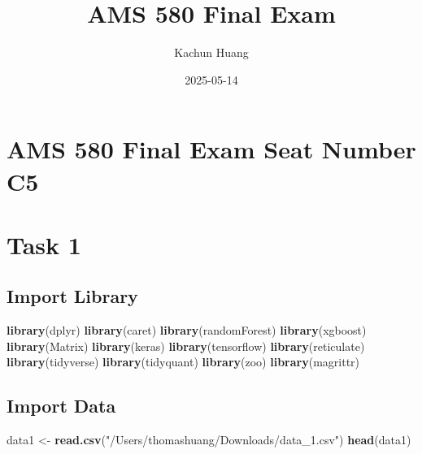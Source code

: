 \documentclass[
]{article}
\title{AMS 580 Final Exam}
\author{Kachun Huang}
\date{2025-05-14}
\newenvironment{Shaded}{\begin{snugshade}}{\end{snugshade}}
\newcommand{\FunctionTok}[1]{\textcolor[rgb]{0.13,0.29,0.53}{\textbf{#1}}}
\newcommand{\NormalTok}[1]{#1}
\newcommand{\OtherTok}[1]{\textcolor[rgb]{0.56,0.35,0.01}{#1}}
\newcommand{\StringTok}[1]{\textcolor[rgb]{0.31,0.60,0.02}{#1}}
\begin{document}
\maketitle

\section{\texorpdfstring{AMS 580 Final Exam \textbf{Seat Number
C5}}{AMS 580 Final Exam Seat Number C5}}\label{ams-580-final-exam-seat-number-c5}

\section{Task 1}\label{task-1}

\subsection{Import Library}\label{import-library}

\begin{Shaded}
\begin{Highlighting}[]
\FunctionTok{library}\NormalTok{(dplyr)}
\FunctionTok{library}\NormalTok{(caret)}
\FunctionTok{library}\NormalTok{(randomForest)}
\FunctionTok{library}\NormalTok{(xgboost)}
\FunctionTok{library}\NormalTok{(Matrix)}
\FunctionTok{library}\NormalTok{(keras)}
\FunctionTok{library}\NormalTok{(tensorflow)}
\FunctionTok{library}\NormalTok{(reticulate)}
\FunctionTok{library}\NormalTok{(tidyverse)}
\FunctionTok{library}\NormalTok{(tidyquant)}
\FunctionTok{library}\NormalTok{(zoo)}
\FunctionTok{library}\NormalTok{(magrittr)}
\end{Highlighting}
\end{Shaded}

\subsection{Import Data}\label{import-data}

\begin{Shaded}
\begin{Highlighting}[]
\NormalTok{data1 }\OtherTok{\textless{}{-}} \FunctionTok{read.csv}\NormalTok{(}\StringTok{"/Users/thomashuang/Downloads/data\_1.csv"}\NormalTok{)}
\FunctionTok{head}\NormalTok{(data1)}
\end{Highlighting}
\end{Shaded}
\end{document}
